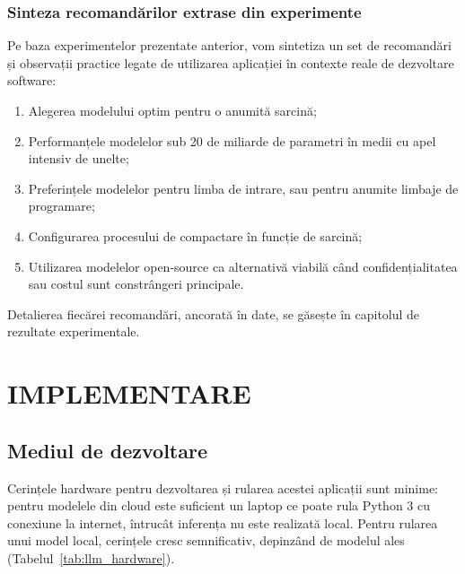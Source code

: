\documentclass[12pt, a4paper, oneside, romanian]{teza-upb}
\begin{document}
  \newpage

  \subsection{Sinteza recomandărilor extrase din experimente}

  Pe baza experimentelor prezentate anterior, vom sintetiza un set de recomandări și observații practice legate de utilizarea aplicației în contexte reale de dezvoltare software:
  \begin{enumerate}
    \item Alegerea modelului optim pentru o anumită sarcină; 
    \item Performanțele modelelor sub 20 de miliarde de parametri în medii cu apel intensiv de unelte; 
    \item Preferințele modelelor pentru limba de intrare, sau pentru anumite limbaje de programare;
    \item Configurarea procesului de compactare în funcție de sarcină;
    \item Utilizarea modelelor open-source ca alternativă viabilă când confidențialitatea sau costul
  sunt constrângeri principale.
  \end{enumerate}

  Detalierea fiecărei recomandări, ancorată în date, se găsește în capitolul de rezultate experimentale.

  \chapter{IMPLEMENTARE}

  \section{Mediul de dezvoltare}

    Cerințele hardware pentru dezvoltarea și rularea acestei aplicații sunt minime: pentru modelele din cloud este suficient un laptop ce poate rula Python 3 cu conexiune la internet, întrucât inferența nu este realizată local. Pentru rularea unui model local, cerințele cresc semnificativ, depinzând de modelul ales (Tabelul~\ref{tab:llm_hardware}).
\end{document}
